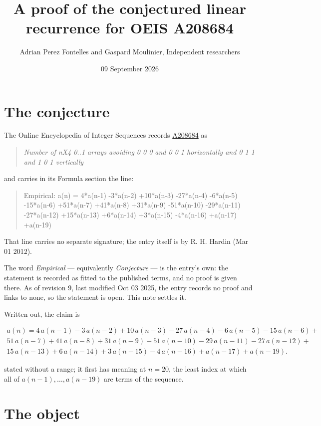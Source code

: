\documentclass[11pt]{article}
\title{A proof of the conjectured linear recurrence for OEIS A208684}
\author{Adrian Perez Fontelles and Gaspard Moulinier, Independent researchers}
\date{09 September 2026}
\theoremstyle{definition}
\begin{document}
\maketitle
\section{The conjecture}

The Online Encyclopedia of Integer Sequences records \href{https://oeis.org/A208684}{A208684} as

\begin{quote}\itshape Number of nX4 0..1 arrays avoiding 0 0 0 and 0 0 1 horizontally and 0 1 1 and 1 0 1 vertically\end{quote}

and carries in its Formula section the line:

\begin{quote}\ttfamily Empirical: a(n) = 4*a(n-1) -3*a(n-2) +10*a(n-3) -27*a(n-4) -6*a(n-5) -15*a(n-6) +51*a(n-7) +41*a(n-8) +31*a(n-9) -51*a(n-10) -29*a(n-11) -27*a(n-12) +15*a(n-13) +6*a(n-14) +3*a(n-15) -4*a(n-16) +a(n-17) +a(n-19)\end{quote}

That line carries no separate signature; the entry itself is by R. H. Hardin (Mar 01 2012).

The word {\itshape Empirical} --- equivalently {\itshape Conjecture} --- is the entry's own: the statement is recorded as fitted to the published terms, and no proof is given there. As of revision 9, last modified Oct 03 2025, the entry records no proof and links to none, so the statement is open. This note settles it.

Written out, the claim is

\begin{multline*} a(n) = 4\,a(n-1) - 3\,a(n-2) + 10\,a(n-3) - 27\,a(n-4) - 6\,a(n-5) - 15\,a(n-6) + \\ 51\,a(n-7) + 41\,a(n-8) + 31\,a(n-9) - 51\,a(n-10) - 29\,a(n-11) - 27\,a(n-12) + \\ 15\,a(n-13) + 6\,a(n-14) + 3\,a(n-15) - 4\,a(n-16) + a(n-17) + a(n-19). \end{multline*}

stated without a range; it first has meaning at $n = 20$, the least index at which all of $a(n-1),\dots,a(n-19)$ are terms of the sequence.

\section{The object}
\end{document}
